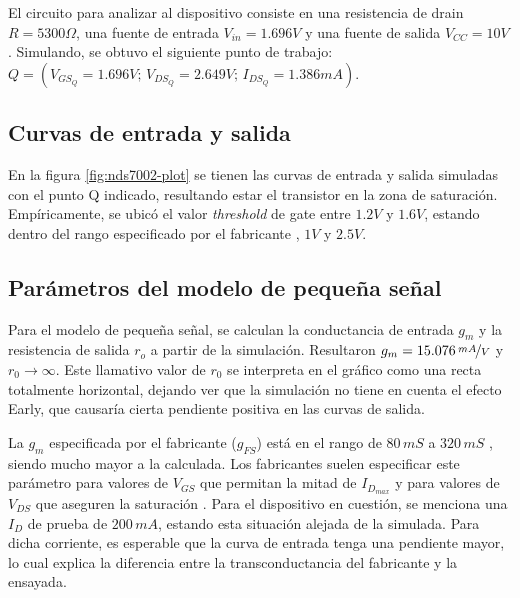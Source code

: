 \documentclass[../main.tex]{subfiles}
\begin{document}
El circuito para analizar al dispositivo consiste en una resistencia de drain $R = 5300\Omega$, una fuente de entrada $V_{in} = 1.696V$ y una fuente de salida $V_{CC} = 10V$. Simulando, se obtuvo el siguiente punto de trabajo: $Q = (V_{GS_Q} = 1.696V;\, V_{DS_Q}=2.649V;\, I_{DS_Q}=1.386mA)$.

\subsection{Curvas de entrada y salida}

En la figura \ref{fig:nds7002-plot} se tienen las curvas de entrada y salida simuladas con el punto Q indicado, resultando estar el transistor en la zona de saturación. Empíricamente, se ubicó el valor \emph{threshold} de gate entre $1.2V$ y $1.6V$, estando dentro del rango especificado por el fabricante \cite{nds7002}, $1V$ y $2.5V$.


% 

\subsection{Parámetros del modelo de pequeña señal}

Para el modelo de pequeña señal, se calculan la conductancia de entrada $g_m$ y la resistencia de salida $r_o$ a partir de la simulación. Resultaron $g_m = 15.076\, \nicefrac{mA}{V}$ y $r_0 \rightarrow \infty$. Este llamativo valor de $r_0$ se interpreta en el gráfico como una recta totalmente horizontal, dejando ver que la simulación no tiene en cuenta el efecto Early, que causaría cierta pendiente positiva en las curvas de salida.

La $g_m$ especificada por el fabricante ($g_{FS}$) está en el rango de $80\,mS$ a $320\,mS$ \cite{nds7002}, siendo mucho mayor a la calculada. Los fabricantes suelen especificar este parámetro para valores de $V_{GS}$ que permitan la mitad de $I_{D_{max}}$ y para valores de $V_{DS}$ que aseguren la saturación \cite{infineon-note}. Para el dispositivo en cuestión, se menciona una $I_D$ de prueba de $200\,mA$, estando esta situación alejada de la simulada. Para dicha corriente, es esperable que la curva de entrada tenga una pendiente mayor, lo cual explica la diferencia entre la transconductancia del fabricante y la ensayada.
\end{document}
